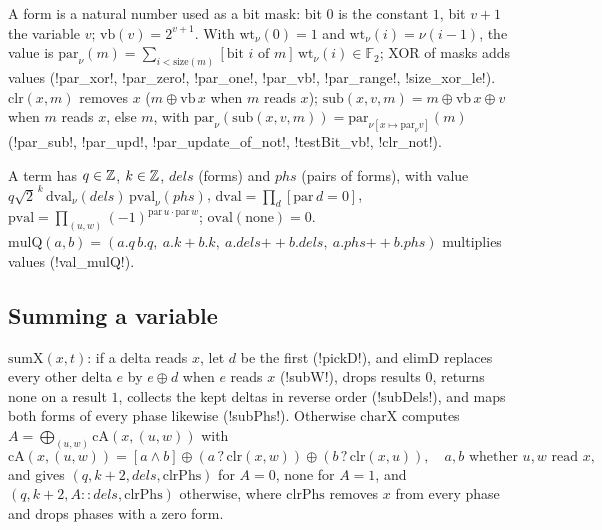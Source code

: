 A form is a natural number used as a bit mask: bit $0$ is the constant $1$, bit $v+1$ the variable $v$; $\mathrm{vb}(v)=2^{v+1}$. With $\mathrm{wt}_\nu(0)=1$ and $\mathrm{wt}_\nu(i)=\nu(i-1)$, the value is $\mathrm{par}_\nu(m)=\sum_{i<\mathrm{size}(m)}[\text{bit }i\text{ of }m]\,\mathrm{wt}_\nu(i)\in\mathbb{F}_2$; XOR of masks adds values (\lean!par_xor!, \lean!par_zero!, \lean!par_one!, \lean!par_vb!, \lean!par_range!, \lean!size_xor_le!). $\mathrm{clr}(x,m)$ removes $x$ ($m\oplus\mathrm{vb}\,x$ when $m$ reads $x$); $\mathrm{sub}(x,v,m)=m\oplus\mathrm{vb}\,x\oplus v$ when $m$ reads $x$, else $m$, with $\mathrm{par}_\nu(\mathrm{sub}(x,v,m))=\mathrm{par}_{\nu[x\mapsto\mathrm{par}_\nu v]}(m)$ (\lean!par_sub!, \lean!par_upd!, \lean!par_update_of_not!, \lean!testBit_vb!, \lean!clr_not!).

\begin{definition}
A term has $q\in\mathbb{Z}$, $k\in\mathbb{Z}$, $\mathit{dels}$ (forms) and $\mathit{phs}$ (pairs of forms), with value $q\sqrt2^{\,k}\,\mathrm{dval}_\nu(\mathit{dels})\,\mathrm{pval}_\nu(\mathit{phs})$, $\mathrm{dval}=\prod_d[\mathrm{par}\,d=0]$, $\mathrm{pval}=\prod_{(u,w)}(-1)^{\mathrm{par}\,u\cdot\mathrm{par}\,w}$; $\mathrm{oval}(\mathrm{none})=0$. $\mathrm{mulQ}(a,b)=(a.q\,b.q,\ a.k+b.k,\ a.\mathit{dels}\mathbin{+\!\!+}b.\mathit{dels},\ a.\mathit{phs}\mathbin{+\!\!+}b.\mathit{phs})$ multiplies values (\lean!val_mulQ!).
\end{definition}

\subsection{Summing a variable}

\begin{definition}
$\mathrm{sumX}(x,t)$: if a delta reads $x$, let $d$ be the first (\lean!pickD!), and $\mathrm{elimD}$ replaces every other delta $e$ by $e\oplus d$ when $e$ reads $x$ (\lean!subW!), drops results $0$, returns $\mathrm{none}$ on a result $1$, collects the kept deltas in reverse order (\lean!subDels!), and maps both forms of every phase likewise (\lean!subPhs!). Otherwise $\mathrm{charX}$ computes $A=\bigoplus_{(u,w)}\mathrm{cA}(x,(u,w))$ with
\[
\mathrm{cA}(x,(u,w))=[a\land b]\oplus(a\,?\,\mathrm{clr}(x,w))\oplus(b\,?\,\mathrm{clr}(x,u)),\quad a,b\text{ whether }u,w\text{ read }x,
\]
and gives $(q,k+2,\mathit{dels},\mathrm{clrPhs})$ for $A=0$, $\mathrm{none}$ for $A=1$, and $(q,k+2,A\mathbin{::}\mathit{dels},\mathrm{clrPhs})$ otherwise, where $\mathrm{clrPhs}$ removes $x$ from every phase and drops phases with a zero form.
\end{definition}

